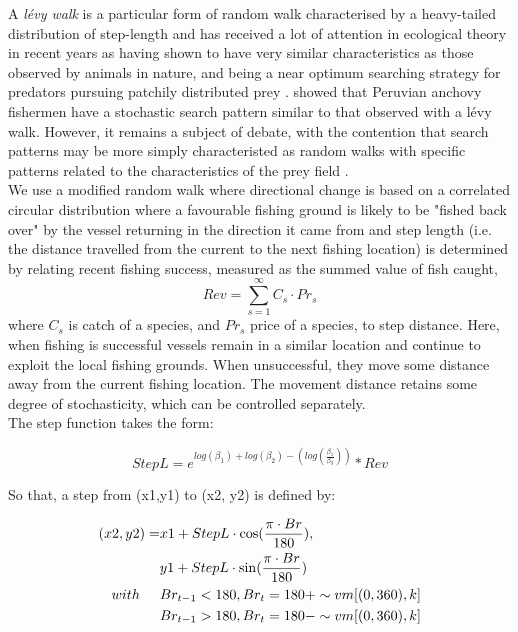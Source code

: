 \documentclass[review]{elsarticle}
\begin{document}
A \textit{lévy walk} is a particular form of random walk characterised by a
heavy-tailed distribution of step-length and has received a lot of attention in
ecological theory in recent years as having shown to have very similar
characteristics as those observed by animals in nature, and being a near
optimum searching strategy for predators pursuing patchily distributed prey
\cite{Bartumeus2005, Sims2008}.  \cite{Bertrand2007} showed that Peruvian
anchovy fishermen have a stochastic search pattern similar to that observed
with a lévy walk. However, it remains a subject of debate, with the contention
that search patterns may be more simply characteristed as random walks
\cite{Sakiyama2013} with specific patterns related to the characteristics of
the prey field \cite{Sims2012}. \\

We use a modified random walk where directional change is based on a correlated
circular distribution where a favourable fishing ground is likely to be "fished
back over" by the vessel returning in the direction it came from and step
length (i.e. the distance travelled from the current to the next fishing
location) is determined by relating recent fishing success, measured as the
summed value of fish caught, $$Rev = \sum_{s=1}^{\infty} C_{s} \cdot Pr_{s}$$
where $C_{s}$ is catch of a species, and $Pr_{s}$ price of a species, to step
distance. Here, when fishing is successful vessels remain in a similar location
and continue to exploit the local fishing grounds. When unsuccessful, they move
some distance away from the current fishing location. The movement distance
retains some degree of stochasticity, which can be controlled separately. \\

The step function takes the form:

\begin{equation*}
	StepL = e^{log(\beta_{1}) + log(\beta_{2}) - (log(\frac{\beta_{1}}{\beta_{3}}))} * Rev
\end{equation*}

So that, a step from (x1,y1) to (x2, y2) is defined by:

\begin{equation*}
	\begin{split}
 (x2, y2) =  & x1 + StepL \cdot \cos (\frac{\pi \cdot Br}{180}), \\
             & y1 + StepL \cdot \sin (\frac{\pi \cdot Br}{180}) \\	
 with  \hspace{0.5cm}     & Br_{t-1} < 180, Br_{t} = 180 + \sim vm[(0,360), k] \\
 			  & Br_{t-1} > 180, Br_{t} = 180 - \sim vm[(0,360), k] \\
	\end{split}
\end{equation*}
\end{document}
